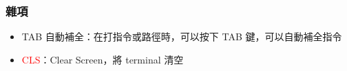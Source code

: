 \documentclass[mathserif]{beamer}
\begin{document}
\begin{frame}
    \frametitle{雜項}
    \begin{itemize}
        \item TAB 自動補全：在打指令或路徑時，可以按下 TAB 鍵，可以自動補全指令
        \item \textcolor{red}{CLS}：Clear Screen，將 terminal 清空
    \end{itemize}
\end{frame}
\end{document}
